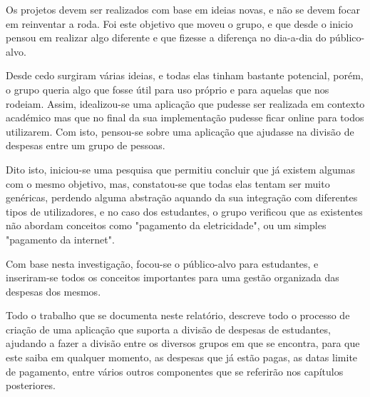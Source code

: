 \begin{resumo}

Os projetos devem ser realizados com base em ideias novas, e não se devem focar em reinventar a roda. Foi este objetivo que moveu o grupo, e que desde o inicio pensou em realizar algo diferente e que fizesse a diferença no dia-a-dia do público-alvo.

Desde cedo surgiram várias ideias, e todas elas tinham bastante potencial, porém, o grupo queria algo que fosse útil para uso próprio e para aquelas que nos rodeiam. Assim, idealizou-se uma aplicação que pudesse ser realizada em contexto académico mas que no final da sua implementação pudesse ficar online para todos utilizarem. Com isto, pensou-se sobre uma aplicação que ajudasse na divisão de despesas entre um grupo de pessoas.

Dito isto, iniciou-se uma pesquisa que permitiu concluir que já existem algumas com o mesmo objetivo, mas, constatou-se que todas elas tentam ser muito genéricas, perdendo alguma abstração aquando da sua integração com diferentes tipos de utilizadores, e no caso dos estudantes, o grupo verificou que as existentes não abordam conceitos como "pagamento da eletricidade", ou um simples "pagamento da internet".

Com base nesta investigação, focou-se o público-alvo para estudantes, e inseriram-se todos os conceitos importantes para uma gestão organizada das despesas dos mesmos.

Todo o trabalho que se documenta neste relatório, descreve todo o processo de criação de uma aplicação que suporta a divisão de despesas de estudantes, ajudando a fazer a divisão entre os diversos grupos em que se encontra, para que este saiba em qualquer momento, as despesas que já estão pagas, as datas limite de pagamento, entre vários outros componentes que se referirão nos capítulos posteriores.

\end{resumo}